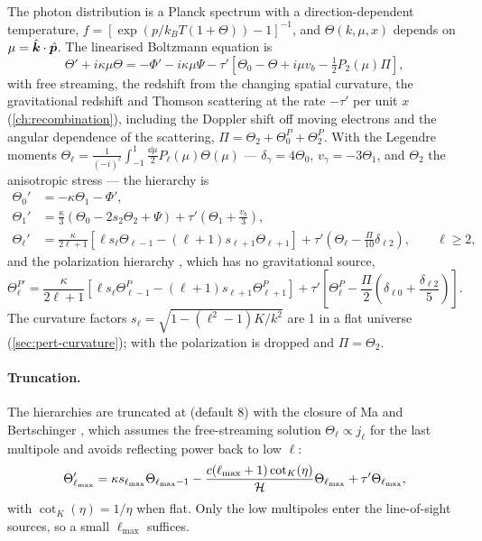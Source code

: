 The photon distribution is a Planck spectrum with a direction-dependent temperature,
$f=[\exp(p/k_BT(1+\Theta))-1]^{-1}$, and $\Theta(k,\mu,x)$ depends on $\mu=\hat{\bm{k}}\cdot\hat{\bm p}$. The linearised
Boltzmann equation is
\begin{equation}
\Theta'+i\kappa\mu\Theta=-\Phi'-i\kappa\mu\Psi-\tau'\left[\Theta_0-\Theta+i\mu v_b-\tfrac12P_2(\mu)\Pi\right],
\label{eq:pert-boltzmann}
\end{equation}
with free streaming, the redshift from the changing spatial curvature, the gravitational redshift and Thomson
scattering at the rate $-\tau'$ per unit $x$ (\cref{ch:recombination}), including the Doppler shift off moving
electrons and the angular dependence of the scattering, $\Pi=\Theta_2+\Theta^P_0+\Theta^P_2$. With the Legendre moments
$\Theta_\ell=\frac{1}{(-i)^\ell}\int_{-1}^1\frac{\dd\mu}{2}P_\ell(\mu)\Theta(\mu)$ --- $\delta_\gamma=4\Theta_0$,
$v_\gamma=-3\Theta_1$, and $\Theta_2$ the anisotropic stress --- the hierarchy is
\begin{align}
\Theta_0'&=-\kappa\Theta_1-\Phi',\\
\Theta_1'&=\frac\kappa3\left(\Theta_0-2s_2\Theta_2+\Psi\right)+\tau'\left(\Theta_1+\frac{v_b}{3}\right),\\
\Theta_\ell'&=\frac{\kappa}{2\ell+1}\left[\ell s_\ell\Theta_{\ell-1}-(\ell+1)s_{\ell+1}\Theta_{\ell+1}\right]
+\tau'\left(\Theta_\ell-\frac{\Pi}{10}\delta_{\ell2}\right),\qquad\ell\ge2,
\end{align}
and the polarization hierarchy \cite{Zaldarriaga1995}, which has no gravitational source,
\begin{equation}
\Theta^{P\prime}_\ell=\frac{\kappa}{2\ell+1}\left[\ell s_\ell\Theta^P_{\ell-1}-(\ell+1)s_{\ell+1}\Theta^P_{\ell+1}\right]
+\tau'\left[\Theta^P_\ell-\frac\Pi2\left(\delta_{\ell0}+\frac{\delta_{\ell2}}{5}\right)\right].
\end{equation}
The curvature factors $s_\ell=\sqrt{1-(\ell^2-1)K/k^2}$ are 1 in a flat universe (\cref{sec:pert-curvature}); with
  the polarization is dropped and $\Pi=\Theta_2$.

\paragraph*{Truncation.} The hierarchies are truncated at  (default 8) with the closure of Ma and
Bertschinger \cite{Ma1995}, which assumes the free-streaming solution $\Theta_\ell\propto j_\ell$ for the last
multipole and avoids reflecting power back to low $\ell$:
\begin{equation}
\Theta'_{\ell_{\max}}=\kappa s_{\ell_{\max}}\Theta_{\ell_{\max}-1}-\frac{c(\ell_{\max}+1)\cot_K(\eta)}{\mathcal{H}}\Theta_{\ell_{\max}}
+\tau'\Theta_{\ell_{\max}},
\end{equation}
with $\cot_K(\eta)=1/\eta$ when flat. Only the low multipoles enter the line-of-sight sources, so a small $\ell_{\max}$
suffices.

